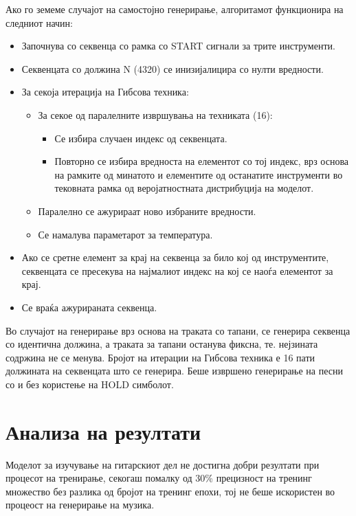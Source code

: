 Ако го земеме случајот на самостојно генерирање, алгоритамот функционира на следниот начин:
\begin{itemize}
    \item Започнува со секвенца со рамка со START сигнали за трите инструменти.
    \item Секвенцата со должина N (4320) се инизијалицира со нулти вредности.
    \item За секоја итерација на Гибсова техника: \begin{itemize}
        \item За секое од паралелните извршувања на техниката (16): \begin{itemize}
            \item Се избира случаен индекс од секвенцата.
            \item Повторно се избира вредноста на елементот со тој индекс, врз основа на рамките од минатото и елементите од останатите инструменти во тековната рамка од веројатностната дистрибуција на моделот.
        \end{itemize}
    \item Паралелно се ажурираат ново избраните вредности.
    \item Се намалува параметарот за температура.
    \end{itemize}
    \item Ако се сретне елемент за крај на секвенца за било кој од инструментите, секвенцата се пресекува на најмалиот индекс на кој се наоѓа елементот за крај.
    \item Се враќа ажурираната секвенца.
\end{itemize}

Во случајот на генерирање врз основа на траката со тапани, се генерира секвенца со идентична должина, а траката за тапани останува фиксна, те. нејзината содржина не се менува. Бројот на итерации на Гибсова техника е 16 пати должината на секвенцата што се генерира. Беше извршено генерирање на песни со и без користење на HOLD симболот.

\section{Анализа на резултати}

Моделот за изучување на гитарскиот дел не достигна добри резултати при процесот на тренирање, секогаш помалку од 30\% прецизност на тренинг множество без разлика од бројот на тренинг епохи, тој не беше искористен во процеост на генерирање на музика. 


